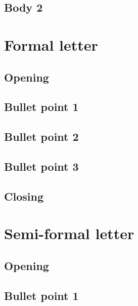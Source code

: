 \documentclass[11pt,a4paper]{article}
\begin{document}
\subsection*{Body 2}
\vspace{1cm}
\clearpage
\section*{Formal letter}
\subsection*{Opening}
\vspace{1cm}
\subsection*{Bullet point 1}
\vspace{1cm}
\subsection*{Bullet point 2}
\vspace{1cm}
\subsection*{Bullet point 3}
\vspace{1cm}
\subsection*{Closing}
\vspace{1cm}
\clearpage
\section*{Semi-formal letter}
\subsection*{Opening}
\vspace{1cm}
\subsection*{Bullet point 1}
\vspace{1cm}
\end{document}
